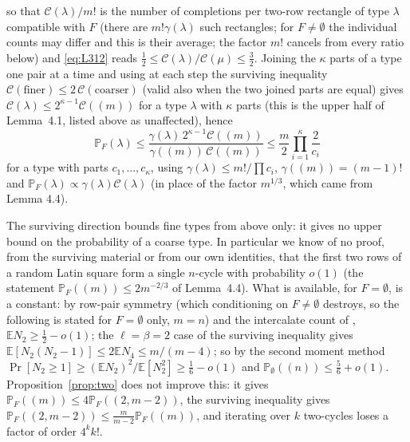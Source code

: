 \documentclass[11pt]{article}
\theoremstyle{remark}
\newcommand{\PP}{\mathbb P}
\newcommand{\CC}{\mathcal C}
\newcommand{\E}{\mathbb E}
\begin{document}
so that $\CC(\lambda)/m!$ is the number of completions per two-row
rectangle of type $\lambda$ compatible with $F$ (there are $m!\gamma(\lambda)$
such rectangles; for $F\ne\emptyset$ the individual counts may differ
and this is their average; the factor $m!$ cancels from every ratio
below) and \eqref{eq:L312} reads $\tfrac12\le\CC(\lambda)/\CC(\mu)\le\tfrac32$.
Joining the $\kappa$ parts of a type one pair at a time and using at
each step the surviving inequality
$\CC(\text{finer})\le2\,\CC(\text{coarser})$ (valid also when the two
joined parts are equal) gives $\CC(\lambda)\le2^{\kappa-1}\CC((m))$ for a
type $\lambda$ with $\kappa$ parts (this is the upper half of Lemma~4.1,
listed above as unaffected), hence
\[
\PP_F(\lambda)\le\frac{\gamma(\lambda)\,2^{\kappa-1}\CC((m))}{\gamma((m))\,\CC((m))}
\le\frac{m}{2}\prod_{i=1}^{\kappa}\frac{2}{c_i}
\]
for a type with parts $c_1,\dots,c_\kappa$, using $\gamma(\lambda)\le m!/\prod c_i$,
$\gamma((m))=(m-1)!$ and $\PP_F(\lambda)\propto\gamma(\lambda)\CC(\lambda)$ (in
place of the factor $m^{1/3}$, which came from Lemma 4.4).

The surviving direction bounds fine types from above only: it gives
no upper bound on the probability of a coarse type.  In
particular we know of no proof, from the surviving material or from our
own identities, that the first two rows of a random Latin square form a
single $n$-cycle with probability $o(1)$ (the statement
$\PP_F((m))\le2m^{-2/3}$ of Lemma~4.4).  What is available, for $F=\emptyset$, is a constant:
by row-pair symmetry (which conditioning on $F\ne\emptyset$ destroys,
so the following is stated for $F=\emptyset$ only, $m=n$) and the
intercalate count of \cite{KS18}, $\E N_2\ge\tfrac12-o(1)$; the $\ell=\beta=2$ case of the surviving
inequality gives $\E[N_2(N_2-1)]\le2\E N_4\le m/(m-4)$; so by the second
moment method $\Pr[N_2\ge1]\ge(\E N_2)^2/\E[N_2^2]\ge\tfrac16-o(1)$ and
$\PP_\emptyset((n))\le\tfrac56+o(1)$.  Proposition~\ref{prop:two} does not improve
this: it gives $\PP_F((m))\le4\PP_F((2,m-2))$, the surviving inequality
gives $\PP_F((2,m-2))\le\tfrac m{m-2}\PP_F((m))$, and iterating over
$k$ two-cycles loses a factor of order $4^kk!$.
\end{document}
